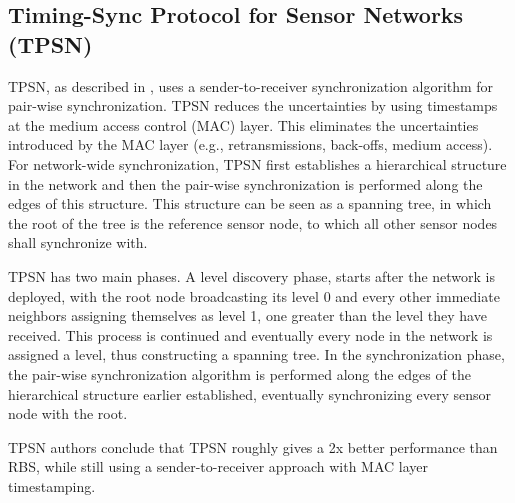 \subsection{Timing-Sync Protocol for Sensor Networks (TPSN)}
\ac{TPSN}, as described in \cite{Ganeriwal03:TPSN}, uses a sender-to-receiver synchronization algorithm for pair-wise synchronization. TPSN reduces the uncertainties by using timestamps at the medium access control (MAC) layer. This eliminates the uncertainties introduced by the MAC layer (e.g., retransmissions, back-offs, medium access). For network-wide synchronization, TPSN first establishes a hierarchical structure in the network and then the pair-wise synchronization is performed along the edges of this structure. This structure can be seen as a spanning tree, in which the root of the tree is the reference sensor node, to which all other sensor nodes shall synchronize with.

TPSN has two main phases. A level discovery phase, starts after the network is deployed, with the root node broadcasting its level 0 and every other immediate neighbors assigning themselves as level 1, one greater than the level they have received. This process is continued and eventually every node in the network is assigned a level, thus constructing a spanning tree. In the synchronization phase, the pair-wise synchronization algorithm is performed along the edges of the hierarchical structure earlier established, eventually synchronizing every sensor node with the root.

TPSN authors conclude that TPSN roughly gives a 2x better performance than RBS, while still using a sender-to-receiver approach with MAC layer timestamping.

